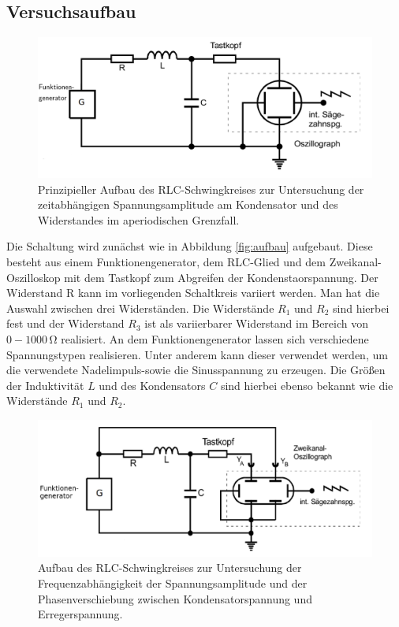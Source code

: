 \subsection{Versuchsaufbau}
\label{sec:Versuchsaufbau}
\begin{figure}
  \includegraphics{Bilder/aufbaau.png}
  \caption{Prinzipieller Aufbau des RLC-Schwingkreises zur Untersuchung der zeitabhängigen Spannungsamplitude am Kondensator und des Widerstandes im aperiodischen Grenzfall.}
  \label{fig:aufbau}
\end{figure}
Die Schaltung wird zunächst wie in Abbildung \eqref{fig:aufbau} aufgebaut. Diese besteht aus einem Funktionengenerator, dem RLC-Glied und dem Zweikanal-Oszilloskop mit dem Tastkopf zum Abgreifen der Kondenstaorspannung.
Der Widerstand R kann im vorliegenden Schaltkreis variiert werden. Man hat die Auswahl zwischen drei Widerständen. Die Widerstände $R_\text{1}$ und $R_\text{2}$ sind hierbei fest und der Widerstand $R_\text{3}$ ist als variierbarer Widerstand im Bereich von $0-1000\,\si{\ohm}$ realisiert.
An dem Funktionengenerator lassen sich verschiedene Spannungstypen realisieren. Unter anderem kann dieser verwendet werden, um die verwendete Nadelimpuls-sowie die Sinusspannung zu erzeugen.
Die Größen der Induktivität $L$ und des Kondensators $C$ sind hierbei ebenso bekannt wie die Widerstände $R_\text{1}$ und $R_\text{2}$.
\begin{figure}
  \includegraphics{Bilder/aufbauu.png}
  \caption{Aufbau des RLC-Schwingkreises zur Untersuchung der Frequenzabhängigkeit der Spannungsamplitude und der Phasenverschiebung zwischen Kondensatorspannung und Erregerspannung.}
  \label{fig:aufbau2}
\end{figure}
